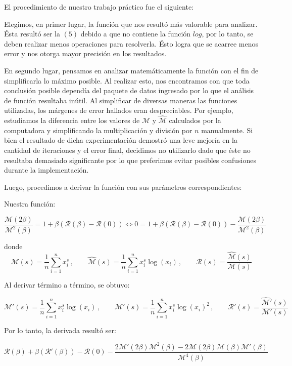 \documentclass[10pt, a4paper]{article}
\newcommand{\eme}{\mathcal{M}}
\newcommand{\emeh}{\widehat{\mathcal{M}}}
\newcommand{\ere}{\mathcal{R}}
\begin{document}
El procedimiento de nuestro trabajo pr\'actico fue el siguiente:\newline

Elegimos, en primer lugar, la funci\'on que nos result\'o m\'as valorable para analizar. \'Esta result\'o ser la $(5)$ debido a que no contiene la funci\'on $log$, por lo tanto, se deben realizar menos operaciones para resolverla. \'Esto logra que se acarree menos error y nos otorga mayor precisi\'on en los resultados.\newline

En segundo lugar, pensamos en analizar matem\'aticamente la funci\'on con el fin de simplificarla lo m\'aximo posible. Al realizar esto, nos encontramos con que toda conclusi\'on posible depend\'ia del paquete de datos ingresado por lo que el an\'alisis de funci\'on resultaba in\'util. Al simplificar de diversas maneras las funciones utilizadas, los m\'argenes de error hallados eran despreciables. Por ejemplo, estudiamos la diferencia entre los valores de $\eme$ y $\emeh$ calculados por la computadora y simplificando la multiplicaci\'on y divisi\'on por $n$ manualmente. Si bien el resultado de dicha experimentaci\'on demostr\'o una leve mejor\'ia en la cantidad de iteraciones y el error final, decidimos no utilizarlo dado que \'este no resultaba demasiado significante por lo que preferimos evitar posibles confusiones durante la implementaci\'on.\newline

Luego, procedimos a derivar la funci\'on con sus par\'ametros correspondientes:\newline

Nuestra funci\'on:

$$\frac{\eme(2\beta)}{\eme^2(\beta)} = 1 + \beta(\ere(\beta)-\ere(0)) \Leftrightarrow 0 = 1 + \beta(\ere(\beta)-\ere(0)) - \frac{\eme(2\beta)}{\eme^2(\beta)}$$

donde 
$$\eme(s) =  \frac{1}{n}\sum_{i=1}^n{x_i^s}\,, \qquad \emeh(s) = \frac{1}{n}\sum_{i=1}^n{x_i^s \log(x_i)}\,,  \qquad \ere(s) = \frac{\emeh(s)}{\eme(s)}$$

Al derivar t\'ermino a t\'ermino, se obtuvo:

$$\eme'(s) = \frac{1}{n}\sum_{i=1}^n{x_i^s \log(x_i)} \,, \qquad \emeh'(s) = \frac{1}{n}\sum_{i=1}^n{x_i^s \log(x_i)^2}\,,  \qquad \ere'(s) = \frac{\emeh'(s)}{\eme'(s)}$$

Por lo tanto, la derivada result\'o ser:

$$\ere(\beta) + \beta(\ere'(\beta)) - \ere(0) - \frac{2\eme'(2\beta)\eme^2(\beta) - 2\eme(2\beta)\eme(\beta)\eme'(\beta)}{\eme^4(\beta)}$$
\\
\end{document}
